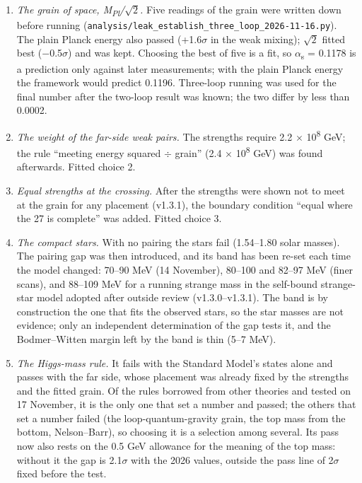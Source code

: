 \documentclass[
  11pt,
]{article}
\providecommand{\tightlist}{%
  \setlength{\itemsep}{0pt}\setlength{\parskip}{0pt}}
\begin{document}
\begin{enumerate}
\def\labelenumi{\arabic{enumi}.}
\tightlist
\item
  \emph{The grain of space, M\textsubscript{Pl}/\ensuremath{\sqrt{2}}.} Five readings of the grain were written down before running (\texttt{analysis/leak\_establish\_three\_loop\_2026-11-16.py}). The plain Planck energy also passed (+1.6\ensuremath{\sigma} in the weak mixing); \ensuremath{\sqrt{2}} fitted best (\ensuremath{-}0.5\ensuremath{\sigma}) and was kept. Choosing the best of five is a fit, so \ensuremath{\alpha}\textsubscript{s} = 0.1178 is a prediction only against later measurements; with the plain Planck energy the framework would predict 0.1196. Three-loop running was used for the final number after the two-loop result was known; the two differ by less than 0.0002.
\item
  \emph{The weight of the far-side weak pairs.} The strengths require 2.2 \ensuremath{\times} 10\textsuperscript{8} GeV; the rule ``meeting energy squared \ensuremath{\div} grain'' (2.4 \ensuremath{\times} 10\textsuperscript{8} GeV) was found afterwards. Fitted choice 2.
\item
  \emph{Equal strengths at the crossing.} After the strengths were shown not to meet at the grain for any placement (v1.3.1), the boundary condition ``equal where the 27 is complete'' was added. Fitted choice 3.
\item
  \emph{The compact stars.} With no pairing the stars fail (1.54--1.80 solar masses). The pairing gap was then introduced, and its band has been re-set each time the model changed: 70--90 MeV (14 November), 80--100 and 82--97 MeV (finer scans), and 88--109 MeV for a running strange mass in the self-bound strange-star model adopted after outside review (v1.3.0--v1.3.1). The band is by construction the one that fits the observed stars, so the star masses are not evidence; only an independent determination of the gap tests it, and the Bodmer--Witten margin left by the band is thin (5--7 MeV).
\item
  \emph{The Higgs-mass rule.} It fails with the Standard Model's states alone and passes with the far side, whose placement was already fixed by the strengths and the fitted grain. Of the rules borrowed from other theories and tested on 17 November, it is the only one that set a number and passed; the others that set a number failed (the loop-quantum-gravity grain, the top mass from the bottom, Nelson--Barr), so choosing it is a selection among several. Its pass now also rests on the 0.5 GeV allowance for the meaning of the top mass: without it the gap is 2.1\ensuremath{\sigma} with the 2026 values, outside the pass line of 2\ensuremath{\sigma} fixed before the test.

\end{enumerate}
\end{document}
